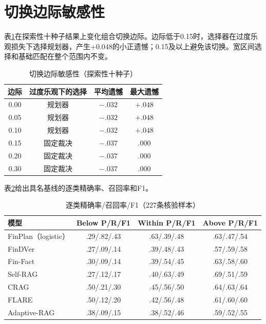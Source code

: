\documentclass[12pt,openany]{ctexbook}
\begin{document}
\section{切换边际敏感性}
\label{app:margin}
表\ref{tab:margin}在探索性十种子结果上变化组合切换边际。边际低于0.15时，选择器在过度乐观损失下选择规划器，产生$+0.048$的小正遗憾；0.15及以上避免该切换。宽区间选择和基础匹配在整个范围内不变。\par
\begin{table}[htbp]
\centering
\caption{切换边际敏感性（探索性十种子）}
\label{tab:margin}
\begin{tabular}{cccc}
\toprule
边际 & 过度乐观下的选择 & 平均遗憾 & 最大遗憾 \\
\midrule
0.00 & 规划器 & $-.032$ & $+.048$ \\
0.05 & 规划器 & $-.032$ & $+.048$ \\
0.10 & 规划器 & $-.032$ & $+.048$ \\
0.15 & 固定裁决 & $-.037$ & $.000$ \\
0.20 & 固定裁决 & $-.037$ & $.000$ \\
0.30 & 固定裁决 & $-.037$ & $.000$ \\
\bottomrule
\end{tabular}
\end{table}

表\ref{tab:perclass}给出具名基线的逐类精确率、召回率和F1。\par
\begin{table}[htbp]
\centering
\caption{逐类精确率/召回率/F1（227条核验样本）}
\label{tab:perclass}
\begin{tabular}{lccc}
\toprule
模型 & Below P/R/F1 & Within P/R/F1 & Above P/R/F1 \\
\midrule
FinPlan（logistic） & .29/.82/.43 & .63/.39/.48 & .63/.47/.54 \\
FinDVer & .27/.09/.14 & .39/.48/.43 & .57/.59/.58 \\
Fin-Fact & .30/.09/.14 & .39/.54/.45 & .63/.58/.60 \\
Self-RAG & .27/.12/.17 & .40/.63/.49 & .69/.51/.59 \\
CRAG & .50/.21/.30 & .45/.56/.50 & .64/.63/.64 \\
FLARE & .50/.12/.20 & .42/.56/.48 & .61/.60/.60 \\
Adaptive-RAG & .38/.09/.15 & .38/.52/.46 & .59/.52/.55 \\
\bottomrule
\end{tabular}
\end{table}
\end{document}
